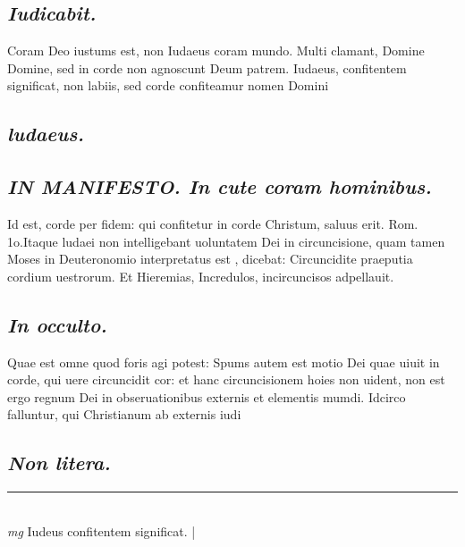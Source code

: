 \documentclass{article}
\begin{document}
\begin{pages}
\subsection*{\textit{Iudicabit. }}\pstart Coram Deo iustums est, non Iudaeus coram mundo.  Multi clamant, Domine Domine, sed in corde non agnoscunt Deum patrem. Iudaeus, confitentem significat, non labiis, sed corde confiteamur nomen Domini\pend
{}
{}
\subsection*{\textit{ludaeus. }}
{}
\subsection*{\textit{IN MANIFESTO. In cute coram hominibus.  }}\pstart Id est, corde per fidem: qui confitetur in corde Christum, saluus erit. Rom. 1o.Itaque ludaei non intelligebant uoluntatem Dei in circuncisione, quam tamen Moses in Deuteronomio interpretatus est , dicebat: Circuncidite praeputia cordium uestrorum. Et Hieremias, Incredulos, incircuncisos adpellauit.   \pend
{}
{}
\subsection*{\textit{In occulto. }}\pstart Quae est omne quod foris agi potest: Spums autem est motio Dei quae uiuit in corde, qui uere circuncidit cor: et hanc circuncisionem hoies non uident, non est ergo regnum Dei in obseruationibus externis et elementis mumdi. Idcirco falluntur, qui Christianum ab externis iudi\pend
{}
{}
\subsection*{\textit{Non litera. }}
\vspace{0.5cm}\noindent
\vspace{0.2cm}\rule{1cm}{0.2pt}\\ 
\hspace{0.2cm}\textit{mg}
\footnotesize Iudeus confitentem significat.  
\normalsize| 

\end{pages}
\end{document}
